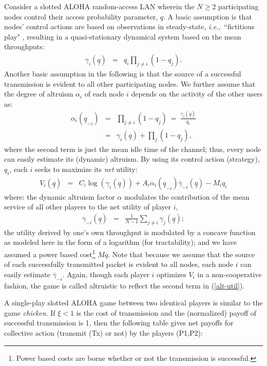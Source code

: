 \documentclass[12pt,onecolumn,draftcls]{IEEEtran}
\newcommand{\ie}{{\em i.e.},~}
\newcommand{\uq}{\underline{q}}
\newcommand{\beqa}{\begin{eqnarray*}}
\newcommand{\eeqa}{\end{eqnarray*}}
\newcommand{\be}{\begin{eqnarray}}
\newcommand{\ee}{\end{eqnarray}}
\begin{document}
Consider a slotted ALOHA random-access LAN wherein the $N\geq 2$
participating nodes control their access probability parameter,  $q$.  A
basic assumption is that nodes' control actions are based on observations
in steady-state, \ie ``fictitious play" \cite{Brown51}, resulting in a
quasi-stationary dynamical system \cite{Jin02a,Jin02b,Wicker03} based on
the mean throughputs:
\beqa
\gamma_i(\uq) & =&  q_i \prod_{j\not=i} (1-q_j).
\eeqa
Another basic assumption in the following is that the source of a
successful transmission is evident to all other participating nodes.  We
further assume that the degree of altruism $\alpha_i$ of each node $i$
depends on the activity of the other users as:
\beqa
\alpha_i(\uq_{-i}) &  = & \prod_{j\not =i} (1-q_j) ~=~\frac{\gamma_i(\uq)}{q_i}\\
& = & \gamma_i(\uq) + \prod_j (1-q_j),
\eeqa
where the second term is just the mean idle time of the channel; thus,
every node can easily estimate  its (dynamic) altruism.  By using its
control action (strategy), $q_i$, each $i$ seeks to maximize its {\em net}
utility: 
\be
V_i(\uq)  & = &  
C_i\log(\gamma_i(\uq))  
+ A_i \alpha_i(\uq_{-i})
\overline{\gamma}_{-i}(\uq) 
- M_i q_i
\label{alt-util}
\ee
where: the dynamic altruism factor $\alpha$ modulates the 
contribution of the mean service of
all other players to the net utility of player $i$,
\be\label{gamma-bar}
\overline{\gamma}_{-i}(\uq)
		& =&   \frac{1}{N-1}\sum_{j\not=i}\gamma_j(\uq);
\ee
the utility derived by one's own throughput is modulated by a concave
function \cite{Jin02a,Jin02b,Jin05} as modeled here in the form of a 
logarithm
(for tractability); and we have assumed a power based cost\footnote{Power
based costs are borne whether or not the transmission is successful.} $M
q$. Note that because we assume that the source of each successfully
transmitted packet is evident to all nodes,  each node $i$ can easily
estimate $\overline{\gamma}_{-i}$.  Again, though each player $i$ optimizes
$V_i$ in a non-cooperative fashion, the game is called altruistic to
reflect the second term in (\ref{alt-util}).








A single-play slotted ALOHA game between two identical players is similar
to the game {\em chicken}. If $\xi<1$ is the cost of transmission
and the (normalized) payoff of successful transmission is 1, then the
following table gives net payoffs for collective action (transmit (Tx) or
not) by the players (P1,P2):\\
\end{document}
